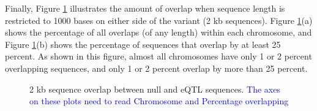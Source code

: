 \documentclass[12pt]{article}
\begin{document}
Finally, Figure \ref{2kbOverlaps} illustrates the amount of overlap when sequence length is restricted to 1000 bases on either side of the variant (2 kb sequences). Figure \ref{2kbOverlaps}(a) shows the percentage of all overlaps (of any length) within each chromosome, and Figure \ref{2kbOverlaps}(b) shows the percentage of sequences that overlap by at least 25 percent. As shown in this figure, almost all chromosomes have only 1 or 2 percent overlapping sequences, and only 1 or 2 percent overlap by more than 25 percent.

\begin{figure}[!htbp]%
\centering
{}%
\qquad
{}
\caption{2 kb sequence overlap between null and eQTL sequences. \textcolor{blue}{The axes on these plots need to
read Chromosome and Percentage overlapping}}\label{2kbOverlaps}%
\end{figure}  
\end{document}
